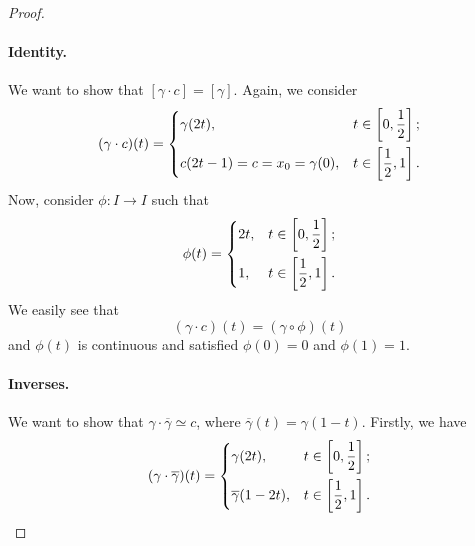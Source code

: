 \begin{proof}
	\paragraph{Identity.} We want to show that \([\gamma\cdot c] = [\gamma]\). Again, we consider
	\[
		(\gamma\cdot c) (t) = \begin{dcases}
			\gamma(2t),                    & t\in\left[0, \frac{1}{2}\right] ; \\
			c(2t-1) = c = x_0 = \gamma(0), & t\in\left[\frac{1}{2}, 1\right].
		\end{dcases}
	\]
	Now, consider \(\phi \colon I\to I\) such that
	\[
		\phi (t) = \begin{dcases}
			2t, & t\in\left[0, \frac{1}{2}\right] ; \\
			1,  & t\in\left[\frac{1}{2}, 1\right].
		\end{dcases}
	\]
	We easily see that
	\[
		(\gamma\cdot c)(t) = (\gamma\circ \phi) (t)
	\]
	and \(\phi (t)\) is continuous and satisfied \(\phi (0) = 0\) and \(\phi (1) = 1\).

	\paragraph{Inverses.} We want to show that \(\gamma\cdot \overline{\gamma} \simeq c\), where \(\overline{\gamma} (t) = \gamma(1-t)\).
	Firstly, we have
	\[
		(\gamma\cdot \overline{\gamma})(t) = \begin{dcases}
			\gamma(2t),               & t\in\left[0, \frac{1}{2}\right]; \\
			\overline{\gamma} (1-2t), & t\in\left[\frac{1}{2}, 1\right].
		\end{dcases}
	\]


\end{proof}
